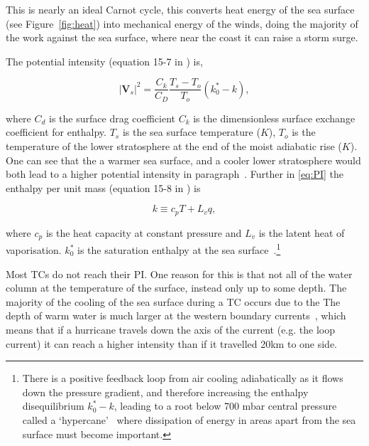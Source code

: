 This is nearly an ideal Carnot cycle, this converts heat energy of the sea surface (see Figure~\ref{fig:heat}) into
mechanical energy of the winds, doing the majority of the work against the sea surface, where near the coast it can raise a storm surge.





The potential intensity (equation 15-7 in \cite{emanuel2018progress}) is,

\begin{equation}
\left|\mathbf{V}_{s}\right|^{2}=\frac{C_{k}}{C_{D}} \frac{T_{s}-T_{o}}{T_{o}}\left(k_{0}^{*}-k\right),
\tag{PI}
\label{eq:PI}
\end{equation}

where $C_d$ is the surface drag coefficient $C_k$ is the dimensionless
surface exchange coefficient for enthalpy.
$T_s$ is the sea surface temperature ($K$), $T_o$ is the temperature of the
lower stratosphere at the end of the moist adiabatic rise ($K$).
One can see that the a warmer sea surface, and a cooler lower stratosphere
would both lead to a higher potential intensity in paragraph~\cite{emanuel1991theory, emanuel2018progress}.
Further in \ref{eq:PI} the enthalpy per unit mass (equation 15-8 in \cite{emanuel2018progress}) is

\begin{equation}
k \equiv c_{p} T+L_{v} q,
\label{eq:enthalpy_per_unit_mass}
\end{equation}

where $c_p$ is the heat capacity at constant pressure and $L_{v}$ is the latent heat
of vaporisation. $k_{0}^{*}$ is the saturation enthalpy at the sea surface~\cite{emanuel2018progress}.\footnote{
There is a positive feedback loop from air cooling adiabatically as it flows down
the pressure gradient, and therefore increasing the enthalpy disequilibrium
$k_{0}^{*}-k$, leading to a root below 700 mbar central pressure called a `hypercane'~\cite{emanuel1987dependence}
where dissipation of energy in areas apart from the sea surface must become important.

}




Most TCs do not reach their PI. One reason for this is that not all of the
water column at the temperature
of the surface, instead only up to some depth. The majority of the cooling of
the sea surface during a TC occurs due to the
The depth of warm water
is much larger at the western boundary currents~\cite{hogg1995western}, which means that if a hurricane
travels down the axis of the current (e.g. the loop current)
it can reach a higher intensity than
if it travelled 20km to one side.


